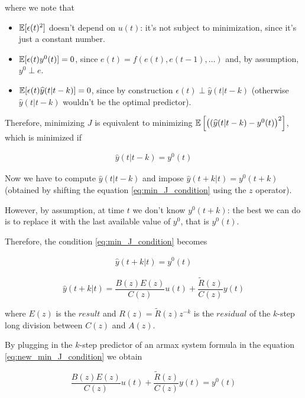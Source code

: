 where we note that

\begin{itemize}
	\item $\mathbb{E} [\epsilon(t)^2 ]$ doesn't depend on $u(t)$: it's not subject to minimization, since it's just a constant number.
	\item $\mathbb{E} [ \epsilon(t) y^0(t) ] = 0$, since $e(t) = f(e(t), e(t-1), \dots) $ and, by assumption, $y^0 \perp e$.
	\item $\mathbb{E} [ \epsilon(t) \widehat{y}(t|t-k) ] = 0$, since by construction $\epsilon(t) \perp \hat{y}(t|t-k)$ (otherwise $\hat{y}(t|t-k)$ wouldn't be the optimal predictor).
\end{itemize}

Therefore, minimizing $J$ is equivalent to minimizing  $\mathbb{E} \left[ \left( (\widehat{y}(t|t-k) - y^0(t) \right)^2 \right]$, which is minimized if

\begin{align}\label{eq:min_J_condition}
	\hat{y}(t|t-k) = y^0(t)
\end{align}

Now we have to compute $\hat{y}(t|t-k)$ and impose $\hat{y}(t+k|t) = y^0(t+k)$ (obtained by shifting the equation \ref{eq:min_J_condition} using the $z$ operator).

However, by assumption, at time $t$ we don't know $y^0(t+k)$: the best we can do is to replace it with the last available value of $y^0$, that is $y^0(t)$.

Therefore, the condition \ref{eq:min_J_condition} becomes 

\begin{align}\label{eq:new_min_J_condition}
	\hat{y}(t+k|t) = y^0(t)
\end{align}

\begin{recall}

	\[
		\hat{y}(t+k|t) = \frac{B(z) E(z)}{C(z)} u(t) + \frac{\tilde{R}(z)}{C(z)} y(t)
	\] 

	where $E(z)$ is the $result$ and $R(z) = \tilde{R}(z) z^{-k}$ is the $residual$ of the $k$-step long division between $C(z)$ and $A(z)$.

\end{recall}

By plugging in the $k$-step predictor of an \gls{armax} system formula in the equation \ref{eq:new_min_J_condition} we obtain

\[
	\frac{B(z) E(z)}{C(z)} u(t) + \frac{\tilde{R}(z)}{C(z)} y(t) = y^0(t)
\]

